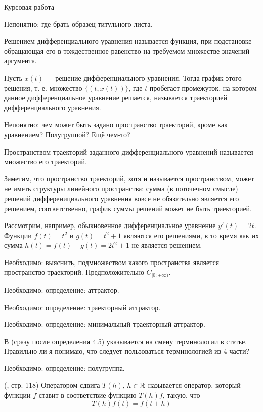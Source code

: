 
\LARGE



Курсовая работа


Непонятно: где брать образец титульного листа.


\opred
Решением дифференциального уравнения называется функция, при подстановке обращающая его в тождественное равенство на требуемом множестве значений аргумента.

\opred
Пусть $x(t)$ --- решение дифференциального уравнения.
Тогда график этого решения, т. е. множество $\{(t,x(t))\}$,
где $t$ пробегает промежуток, на котором данное дифференциальное уравнение решается,
называется траекторией дифференциального уравнения.


Непонятно: чем может быть задано пространство траекторий, кроме как уравнением?
Полугруппой?
Ещё чем-то?


\opred
Пространством траекторий заданного дифференциального уравнений называется множество его траекторий.

Заметим, что пространство траекторий, хотя и называется пространством, может не иметь структуры линейного пространства:
сумма (в поточечном смысле) решений дифференициального уравнения вовсе не обязательно является его решением,
соответственно, график суммы решений может не быть траекторией.

Рассмотрим, например, обыкновенное дифференциальное уравнение $y'(t) = 2t$.
Функции $f(t)=t^2$ и $g(t)=t^2 +1$ являются его решениями, в то время как их сумма $h(t) = f(t) + g(t) = 2t^2 + 1$ не является решением.


Необходимо: выяснить, подмножеством какого пространства является пространство траекторий.
Предположительно $C_{[0;+\infty)}$.





Необходимо: определение: аттрактор.


Необходимо: определение: траекторный аттрактор.


Необходимо: определение: минимальный траекторный аттрактор.

В \cite{Kondratyev} (сразу после определения 4.5) указывается на смену терминологии в статье.
Правильно ли я понимаю, что следует пользоваться терминологией из 4 части?


Необходимо: определение: полугруппа.


\opred (\cite{Zelenaya}, стр. 118)
Оператором сдвига $T(h)$, $h\in\mathbb{R}$ называется оператор, который функции $f$ ставит в соответствие функцию $T(h)f$, такую, что
$$
T(h)f(t)=f(t+h)
$$


